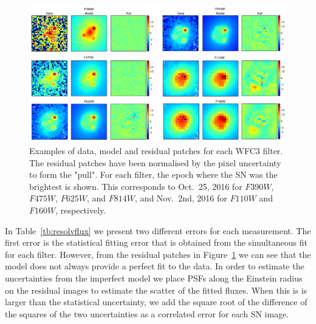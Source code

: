 \documentclass[a4paper,fleqn,usenatbib]{mnras}
\newcommand{\sn}{SN\xspace}
\newcommand{\wfc}{WFC3\xspace}
\newcommand{\wfcuvis}{WFC3/UVIS\xspace}
\newcommand{\wfcir}{WFC3/IR\xspace}
\newcommand{\jband}{{\it J}\xspace}
\newcommand{\hstu}{$F390W$\xspace}
\newcommand{\hstb}{$F475W$\xspace}
\newcommand{\hstr}{$F625W$\xspace}
\newcommand{\hsti}{$F814W$\xspace}
\newcommand{\hstj}{$F110W$\xspace}
\newcommand{\hsth}{$F160W$\xspace}
\begin{document}
\begin{figure}
	\centering
	\caption{%
		Examples of data, model and residual patches for each \wfc filter.  The residual patches have been normalised by the 
		pixel uncertainty to form the "pull".  For each filter, the epoch where the \sn was the brightest is shown.  This corresponds
		to Oct.~25, 2016 for \hstu, \hstb, \hstr, and \hsti,  and Nov.~2nd, 2016 for \hstj and \hsth, respectively.
	\label{fig:wfcforward}}
	\includegraphics[width=\textwidth]{wfc3_patches_v2.pdf}
\end{figure}

%  

In Table~\ref{tb:resolvflux} we present two different errors for each measurement.  The first error is the statistical fitting error that is obtained 
from the simultaneous fit for each filter.  However, from the residual patches in Figure~\ref{fig:wfcforward} we can 
see that the model does not always provide a perfect fit to the data.  In order to estimate the uncertainties from the imperfect model we 
place PSFs along the Einstein radius on the residual images to estimate the scatter of the fitted fluxes.  When this is is larger than the statistical uncertainty, we add the square root of the difference of the squares of the two uncertainties as a correlated error for each \sn image.
\end{document}
